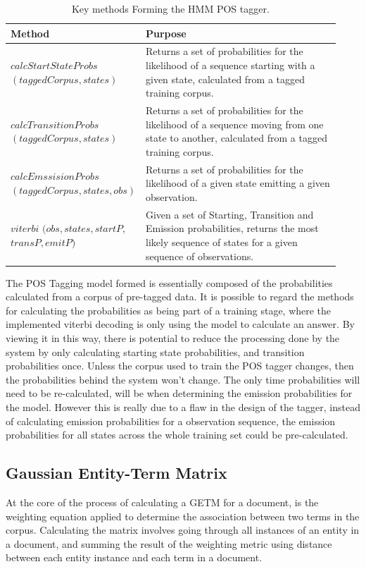 \documentclass[10pt]{report}
\begin{document}
\renewcommand{\baselinestretch}{1.0}\normalsize
\renewcommand{\arraystretch}{2.0}
\begin{table}[h!]
  \begin{tabular}{>{\raggedright}p{0.3\linewidth} | p{0.63\linewidth}}
    Method & Purpose\\
    \hline
    $calcStartStateProbs$ $(taggedCorpus, states)$& Returns a set of probabilities for the likelihood of a sequence starting with a given state, calculated from a tagged training corpus. \\
    $calcTransitionProbs$ $(taggedCorpus, states)$ & Returns a set of probabilities for the likelihood of a sequence moving from one state to another, calculated from a tagged training corpus. \\
    $calcEmssisionProbs$ $(taggedCorpus, states, obs)$ & Returns a set of probabilities for the likelihood of a given state emitting a given observation.\\
    $viterbi$ $(obs, states, startP,$ $transP, emitP)$ & Given a set of Starting, Transition and Emission probabilities, returns the most likely sequence of states for a given sequence of observations. 
  \end{tabular}
  \caption{Key methods Forming the HMM POS tagger.\label{tab:pos_tagging_methods}}
\end{table}
\renewcommand{\baselinestretch}{2.0}\normalsize
\renewcommand{\arraystretch}{1.0}

The POS Tagging model formed is essentially composed of the probabilities calculated from a corpus of pre-tagged data. It is possible to regard the methods for calculating the probabilities as being part of a training stage, where the implemented viterbi decoding is only using the model to calculate an answer. By viewing it in this way, there is potential to reduce the processing done by the system by only calculating starting state probabilities, and transition probabilities once. Unless the corpus used to train the POS tagger changes, then the probabilities behind the system won't change. The only time probabilities will need to be re-calculated, will be when determining the emission probabilities for the model. However this is really due to a flaw in the design of the tagger, instead of calculating emission probabilities for a observation sequence, the emission probabilities for all states across the whole training set could be pre-calculated.

\subsection{Gaussian Entity-Term Matrix}
At the core of the process of calculating a GETM for a document, is the weighting equation applied to determine the association between two terms in the corpus. Calculating the matrix involves going through all instances of an entity in a document, and summing the result of the weighting metric using distance between each entity instance and each term in a document.
\end{document}
